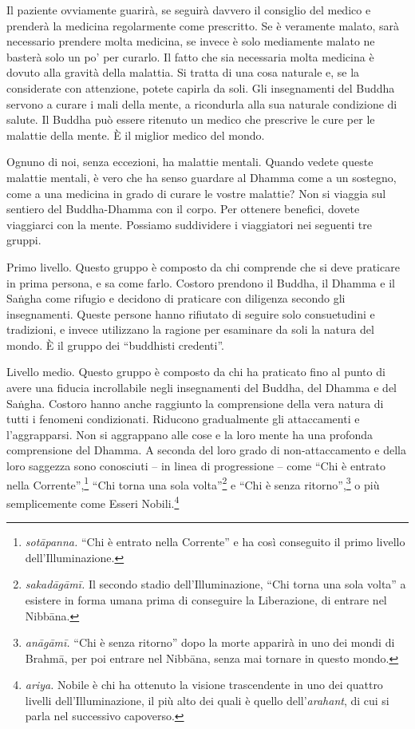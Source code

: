 Il paziente ovviamente guarirà, se seguirà davvero il consiglio del
medico e prenderà la medicina regolarmente come prescritto. Se è
veramente malato, sarà necessario prendere molta medicina, se invece è
solo mediamente malato ne basterà solo un po' per curarlo. Il fatto che
sia necessaria molta medicina è dovuto alla gravità della malattia. Si
tratta di una cosa naturale e, se la considerate con attenzione, potete
capirla da soli. Gli insegnamenti del Buddha servono a curare i mali
della mente, a ricondurla alla sua naturale condizione di salute. Il
Buddha può essere ritenuto un medico che prescrive le cure per le
malattie della mente. È il miglior medico del mondo.

Ognuno di noi, senza eccezioni, ha malattie mentali. Quando vedete
queste malattie mentali, è vero che ha senso guardare al Dhamma come a
un sostegno, come a una medicina in grado di curare le vostre malattie?
Non si viaggia sul sentiero del Buddha-Dhamma con il corpo. Per ottenere
benefici, dovete viaggiarci con la mente. Possiamo suddividere i
viaggiatori nei seguenti tre gruppi.

Primo livello. Questo gruppo è composto da chi comprende che si deve
praticare in prima persona, e sa come farlo. Costoro prendono il Buddha,
il Dhamma e il Saṅgha come rifugio e decidono di praticare con diligenza
secondo gli insegnamenti. Queste persone hanno rifiutato di seguire solo
consuetudini e tradizioni, e invece utilizzano la ragione per esaminare
da soli la natura del mondo. È il gruppo dei ``buddhisti credenti''.

Livello medio. Questo gruppo è composto da chi ha praticato fino al
punto di avere una fiducia incrollabile negli insegnamenti del Buddha,
del Dhamma e del Saṅgha. Costoro hanno anche raggiunto la comprensione
della vera natura di tutti i fenomeni condizionati. Riducono
gradualmente gli attaccamenti e l'aggrapparsi. Non si aggrappano alle
cose e la loro mente ha una profonda comprensione del Dhamma. A seconda
del loro grado di non-attaccamento e della loro saggezza sono conosciuti
-- in linea di progressione -- come ``Chi è entrato nella
Corrente'',\footnote{\emph{sotāpanna.} ``Chi è entrato nella Corrente''
  e ha così conseguito il primo livello dell'Illuminazione.} ``Chi torna
una sola volta''\footnote{\emph{sakadāgāmī.} Il secondo stadio
  dell'Illuminazione, ``Chi torna una sola volta'' a esistere in forma
  umana prima di conseguire la Liberazione, di entrare nel
  Nibbāna.} e ``Chi è senza ritorno'',\footnote{\emph{anāgāmī.}
  ``Chi è senza ritorno'' dopo la morte apparirà in uno dei mondi di
  Brahmā, per poi entrare nel Nibbāna, senza mai tornare in
  questo mondo.} o più semplicemente come Esseri Nobili.\footnote{\emph{ariya.}
  Nobile è chi ha ottenuto la visione trascendente in uno dei quattro
  livelli dell'Illuminazione, il più alto dei quali è quello
  dell'\emph{arahant}, di cui si parla nel successivo capoverso.}

